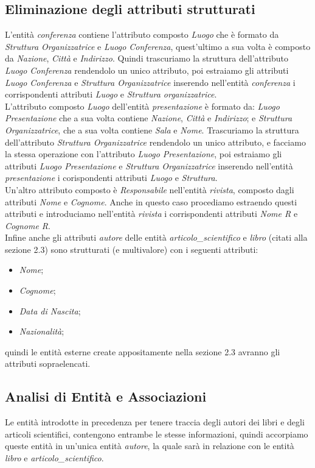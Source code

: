 \documentclass{article}
\begin{document}
\subsection{Eliminazione degli attributi strutturati}
L'entità \textit{conferenza} contiene l'attributo composto \textit{Luogo} che è formato da \textit{Struttura Organizzatrice} e \textit{Luogo Conferenza}, quest'ultimo a sua volta è composto da \textit{Nazione}, \textit{Città} e \textit{Indirizzo}. Quindi trascuriamo la struttura dell'attributo \textit{Luogo Conferenza} rendendolo un unico attributo, poi estraiamo gli attributi \textit{Luogo Conferenza} e \textit{Struttura Organizzatrice} inserendo nell'entità \textit{conferenza} i corrispondenti attributi \textit{Luogo} e \textit{Struttura organizzatrice}.\\
L'attributo composto \textit{Luogo} dell'entità \textit{presentazione} è formato da: \textit{Luogo Presentazione} che a sua volta contiene \textit{Nazione}, \textit{Città} e \textit{Indirizzo}; e \textit{Struttura Organizzatrice}, che a sua volta contiene \textit{Sala} e \textit{Nome}. Trascuriamo la struttura dell'attributo \textit{Struttura Organizzatrice} rendendolo un unico attributo, e facciamo la stessa operazione con l'attributo  \textit{Luogo Presentazione}, poi  estraiamo gli attributi  \textit{Luogo Presentazione} e \textit{Struttura Organizzatrice} inserendo nell'entità \textit{presentazione} i corispondenti attributi \textit{Luogo} e \textit{Struttura}.\\
Un'altro attributo composto è \textit{Responsabile} nell'entità \textit{rivista}, composto dagli attributi \textit{Nome} e \textit{Cognome}. Anche in questo caso procediamo estraendo questi attributi e introduciamo nell'entità \textit{rivista} i corrispondenti attributi \textit{Nome R} e \textit{Cognome R}.\\
Infine anche gli attributi \textit{autore} delle entità \textit{articolo\_scientifico} e \textit{libro} (citati alla sezione 2.3) sono strutturati (e multivalore) con i seguenti attributi: \begin{itemize} 
\item \textit{Nome}; 
\item \textit{Cognome};
\item \textit{Data di Nascita};
\item \textit{Nazionalità};
\end{itemize}
quindi le entità esterne create appositamente nella sezione 2.3 avranno gli attributi sopraelencati.

\subsection{Analisi di Entità e Associazioni}
Le entità introdotte in precedenza per tenere traccia degli autori dei libri e degli articoli scientifici, contengono entrambe le stesse informazioni, quindi accorpiamo queste entità in un'unica entità \textit{autore}, la quale sarà in relazione con le entità \textit{libro} e \textit{articolo\_scientifico}.
\end{document}
